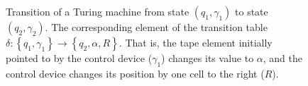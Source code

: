 \begin{figure}
\centering



\caption{Transition of a Turing machine from state $(q_1, \gamma_1)$ to state $(q_2, \gamma_2)$. The corresponding element of the transition table $\delta: \left\{q_1, \gamma_1\right\} \rightarrow \left\{q_2, \alpha, R\right\}$. That is, the tape element initially pointed to by the control device ($\gamma_1$) changes its value to $\alpha$, and the control device changes its position by one cell to the right ($R$).}
\label{figAddAlgoTuringTrans}
\end{figure}